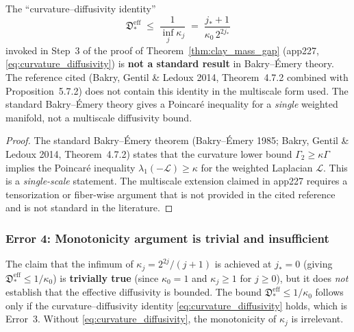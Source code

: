 \begin{theorem}
\label{thm:err3}
The ``curvature--diffusivity identity''
\begin{equation*}
  \mathfrak{D}_{*}^{\mathrm{eff}}
  \;\le\;\frac{1}{\inf_{j}\kappa_{j}}
  \;=\;\frac{j_{*}+1}{\kappa_{0}\,2^{2j_{*}}}
\end{equation*}
invoked in Step~3 of the proof of
Theorem~\ref{thm:clay_mass_gap} (app227,
\eqref{eq:curvature_diffusivity}) is \textbf{not a standard
result} in Bakry--\'Emery theory. The reference cited
(Bakry, Gentil \& Ledoux 2014, Theorem~4.7.2 combined with
Proposition~5.7.2) does not contain this identity in the
multiscale form used. The standard Bakry--\'Emery theory
gives a Poincar\'e inequality for a \emph{single} weighted
manifold, not a multiscale diffusivity bound.
\end{theorem}

\begin{proof}
The standard Bakry--\'Emery theorem (Bakry--\'Emery 1985;
Bakry, Gentil \& Ledoux 2014, Theorem~4.7.2) states that the
curvature lower bound $\Gamma_{2}\ge\kappa\Gamma$ implies the
Poincar\'e inequality $\lambda_{1}(-\mathcal{L})\ge\kappa$ for
the weighted Laplacian $\mathcal{L}$. This is a
\emph{single-scale} statement. The multiscale extension claimed
in app227 requires a tensorization or fiber-wise argument that
is not provided in the cited reference and is not standard in
the literature.
\end{proof}

\subsubsection{Error 4: Monotonicity argument is trivial and
insufficient}

\begin{theorem}
\label{thm:err4}
The claim that the infimum of $\kappa_{j}=2^{2j}/(j+1)$ is
achieved at $j_{*}=0$ (giving
$\mathfrak{D}_{*}^{\mathrm{eff}}\le 1/\kappa_{0}$) is
\textbf{trivially true} (since $\kappa_{0}=1$ and
$\kappa_{j}\ge 1$ for $j\ge 0$), but it does \emph{not}
establish that the effective diffusivity is bounded. The bound
$\mathfrak{D}_{*}^{\mathrm{eff}}\le 1/\kappa_{0}$ follows only
if the curvature--diffusivity identity
\eqref{eq:curvature_diffusivity} holds, which is Error~3.
Without \eqref{eq:curvature_diffusivity}, the monotonicity of
$\kappa_{j}$ is irrelevant.
\end{theorem}

